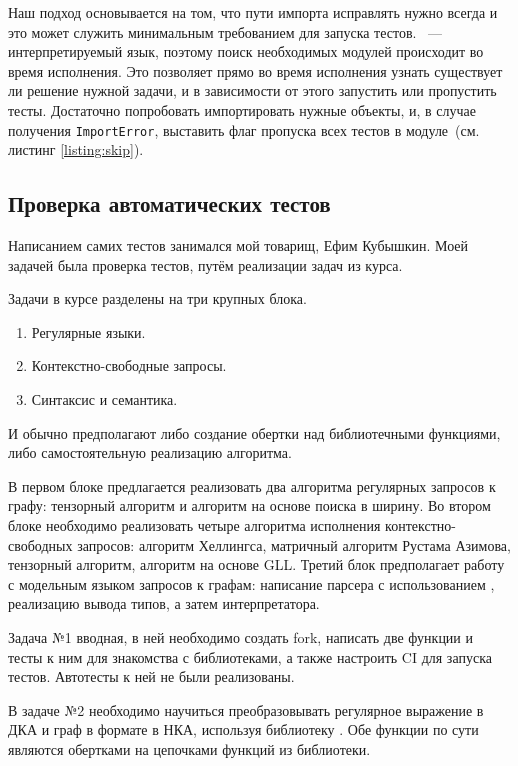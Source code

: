 Наш подход основывается на том, что пути импорта исправлять нужно всегда и это может служить минимальным требованием для запуска тестов.
\python{}~--- интерпретируемый язык, поэтому поиск необходимых модулей происходит во время исполнения.
Это позволяет прямо во время исполнения узнать существует ли решение нужной задачи, и в зависимости от этого запустить или пропустить тесты.
Достаточно попробовать импортировать нужные объекты, и, в случае получения \texttt{ImportError}, выставить флаг пропуска всех тестов в модуле~(см. листинг \ref{listing:skip}).

\subsection{Проверка автоматических тестов}
\label{subsec:slns}

Написанием самих тестов занимался мой товарищ, Ефим Кубышкин.
Моей задачей была проверка тестов, путём реализации задач из курса.

Задачи в курсе разделены на три крупных блока.
\begin{enumerate}
    \item Регулярные языки.
    \item Контекстно-свободные запросы.
    \item Синтаксис и семантика.
\end{enumerate}
И обычно предполагают либо создание обертки над библиотечными функциями, либо самостоятельную реализацию алгоритма.

В первом блоке предлагается реализовать два алгоритма регулярных запросов к графу: тензорный алгоритм и алгоритм на основе поиска в ширину.
Во втором блоке необходимо реализовать четыре алгоритма исполнения контекстно-свободных запросов: алгоритм Хеллингса, матричный алгоритм Рустама Азимова, тензорный алгоритм, алгоритм на основе GLL.
Третий блок предполагает работу с модельным языком запросов к графам: написание парсера с использованием \antlr{}, реализацию вывода типов, а затем интерпретатора.

Задача №1 вводная, в ней необходимо создать fork, написать две функции и тесты к ним для знакомства с библиотеками, а также настроить CI для запуска тестов.
Автотесты к ней не были реализованы.

В задаче №2 необходимо научиться преобразовывать регулярное выражение в ДКА и граф в формате \networkx{} в НКА, используя библиотеку \pyformlang{}.
Обе функции по сути являются обертками на цепочками функций из библиотеки.

